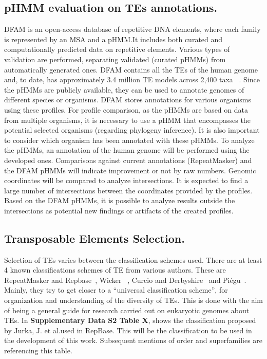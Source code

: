 \documentclass[unnumsec,webpdf,contemporary,large]{oup-authoring-template}%
\theoremstyle{thmstyleone}%
\theoremstyle{thmstyletwo}%
\theoremstyle{thmstylethree}%
\begin{document}
\subsection{pHMM evaluation on TEs annotations.}\label{subsec2_4}

DFAM is an open-access database of repetitive DNA elements, where each family is
represented by an MSA and a pHMM.\@ It includes both curated and computationally
predicted data on repetitive elements. Various types of validation are
performed, separating validated (curated pHMMs) from automatically generated
ones. DFAM contains all the TEs of the human genome and, to date, has
approximately 3.4 million TE models across 2,400 taxa
~\cite{storer_curation_2021, dfam_team_dfam_2023}. Since the pHMMs are publicly
available, they can be used to annotate genomes of different species or
organisms. DFAM stores annotations for various organisms using these profiles.
For profile comparison, as the pHMMs are based on data from multiple organisms,
it is necessary to use a pHMM that encompasses the potential selected organisms
(regarding phylogeny inference). It is also important to consider which organism
has been annotated with these pHMMs. To analyze the pHMMs, an annotation of the
human genome will be performed using the developed ones. Comparisons against
current annotations (RepeatMasker) and the DFAM pHMMs will indicate improvement
or not by raw numbers. Genomic coordinates will be compared to analyze
intersections. It is expected to find a large number of intersections between
the coordinates provided by the profiles. Based on the DFAM pHMMs, it is
possible to analyze results outside the intersections as potential new findings
or artifacts of the created profiles.

\subsection{Transposable Elements Selection.}\label{subsec2_5}

Selection of TEs varies between the classification schemes used. There are at
least 4 known classifications schemes of TE from various authors. These are
RepeatMasker and Repbase~\cite{kapitonov_universal_2008}, Wicker
~\cite{wicker_unified_2007}, Curcio and Derbyshire~\cite{curcio_outs_2003} and
Piégu~\cite{piegu_survey_2015}. Mainly, they try to get closer to a “universal
classification scheme”, for organization and understanding of the diversity of
TEs. This is done with the aim of being a general guide for research carried out
on eukaryotic genomes about TEs. In \textbf{Supplementary Data S2 Table X},
shows the classification proposed by Jurka, J. et al.\@ used in RepBase. This
will be the classification to be used in the development of this work.
Subsequent mentions of order and superfamilies are referencing this table.
\end{document}

